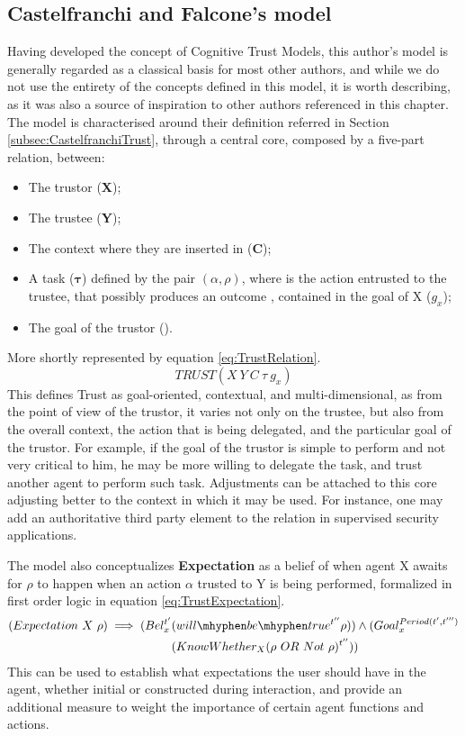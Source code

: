 \subsection{Castelfranchi and Falcone's model}
\label{subsec:Related work:Trust Models:Castelfranchi and Falcone}
Having developed the concept of Cognitive Trust Models, this author's model is generally regarded as a classical basis for most other authors, and while we do not use the entirety of the concepts defined in this model, it is worth describing, as it was also a source of inspiration to other authors referenced in this chapter. 
The model is characterised around their definition referred in Section \ref{subsec:CastelfranchiTrust}, through a central core, composed by a five-part relation, between:
\begin{itemize}
    \item The trustor (\textbf{X});
    \item The trustee (\textbf{Y});
    \item The context where they are inserted in (\textbf{C});
    \item A task ($\bm{\tau}$) defined by the pair $(\alpha, \rho)$, where \bm{$\alpha$} is the action  entrusted to the trustee, that possibly produces an outcome \bm{$\rho$}, contained in the goal of X ($g_x$);
    \item The goal of the trustor ().
\end{itemize}
More shortly represented by equation \ref{eq:TrustRelation}.
\begin{equation}
TRUST(X\ Y\ C\ \tau\ g_x)
\label{eq:TrustRelation}
\end{equation}
This defines Trust as goal-oriented, contextual, and multi-dimensional, as from the point of view of the trustor, it varies not only on the trustee, but also from the overall context, the action that is being delegated, and the particular goal of the trustor. For example, if the goal of the trustor is simple to perform and not very critical to him, he may be more willing to delegate the task, and trust another agent to perform such task. Adjustments can be attached to this core adjusting better to the context in which it may be used. For instance, one may add an authoritative third party element to the relation in supervised security applications.

The model also conceptualizes \textbf{Expectation} as a belief of when agent X awaits for $\rho$ to happen when an action $\alpha$ trusted to Y is being performed, formalized in first order logic in equation \ref{eq:TrustExpectation}.
\begin{equation}
\begin{aligned}
(Expectation\ X\ \rho) \implies (Bel_x^{t'} &(will\mhyphen be\mhyphen true ^ {t''} \rho)) \wedge (Goal_x^{Period(t', t''')} \\
&(KnowWhether_X (\rho\ OR\ Not\ \rho)^{t''}))
\end{aligned}
\label{eq:TrustExpectation}
\end{equation}
This can be used to establish what expectations the user should have in the agent, whether initial or constructed during interaction, and provide an additional measure to weight the importance of certain agent functions and actions.

